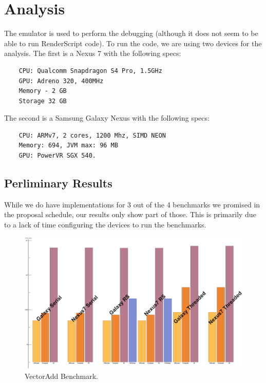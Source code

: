 \section*{Analysis}

The emulator is used to perform the debugging (although it does not seem to be able to run RenderScript code).
To run the code, we are using two devices for the analysis.
The first is a Nexus 7 with the following specs:

\begin{verbatim}
    CPU: Qualcomm Snapdragon S4 Pro, 1.5GHz
    GPU: Adreno 320, 400MHz
    Memory - 2 GB
    Storage 32 GB
\end{verbatim}

The second is a Samsung Galaxy Nexus with the following specs:

\begin{verbatim}
    CPU: ARMv7, 2 cores, 1200 Mhz, SIMD NEON
    Memory: 694, JVM max: 96 MB
    GPU: PowerVR SGX 540.
\end{verbatim}


\subsection*{Perliminary Results}

While we do have implementations for 3 out of the 4 benchmarks we promised in the proposal schedule,
  our results only show part of those.
This is primarily due to a lack of time configuring the devices to run the benchmarks.


\begin{figure}[t!]
\includegraphics[scale=0.125]{VectorAdd.png}
\caption{VectorAdd Benchmark.}
\label{fig:schedule}
\centering
\end{figure}



